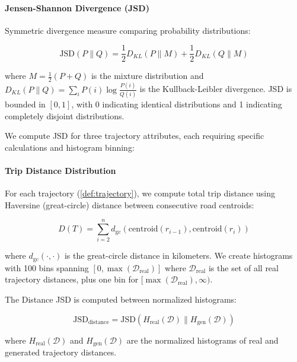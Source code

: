 \paragraph{Jensen-Shannon Divergence (JSD)}

Symmetric divergence measure comparing probability distributions:

\begin{equation}
    \text{JSD}(P \parallel Q) = \frac{1}{2} D_{KL}(P \parallel M) + \frac{1}{2} D_{KL}(Q \parallel M)
    \label{eq:jsd-appendix}
\end{equation}

where $M = \frac{1}{2}(P + Q)$ is the mixture distribution and $D_{KL}(P \parallel Q) = \sum_i P(i) \log \frac{P(i)}{Q(i)}$ is the Kullback-Leibler divergence. JSD is bounded in $[0, 1]$, with 0 indicating identical distributions and 1 indicating completely disjoint distributions.

We compute JSD for three trajectory attributes, each requiring specific calculations and histogram binning:

\paragraph{Trip Distance Distribution}

For each trajectory (\autoref{def:trajectory}), we compute total trip distance using Haversine (great-circle) distance between consecutive road centroids:

\begin{equation}
    D(T) = \sum_{i=2}^{n} d_{\text{gc}}(\text{centroid}(r_{i-1}), \text{centroid}(r_i))
    \label{eq:trip-distance}
\end{equation}

where $d_{\text{gc}}(\cdot, \cdot)$ is the great-circle distance in kilometers. We create histograms with 100 bins spanning $[0, \max(\mathcal{D}_{\text{real}})]$ where $\mathcal{D}_{\text{real}}$ is the set of all real trajectory distances, plus one bin for $[\max(\mathcal{D}_{\text{real}}), \infty)$.

The Distance JSD is computed between normalized histograms:

\begin{equation}
    \text{JSD}_{\text{distance}} = \text{JSD}(H_{\text{real}}(\mathcal{D}) \parallel H_{\text{gen}}(\mathcal{D}))
    \label{eq:distance-jsd}
\end{equation}

where $H_{\text{real}}(\mathcal{D})$ and $H_{\text{gen}}(\mathcal{D})$ are the normalized histograms of real and generated trajectory distances.

